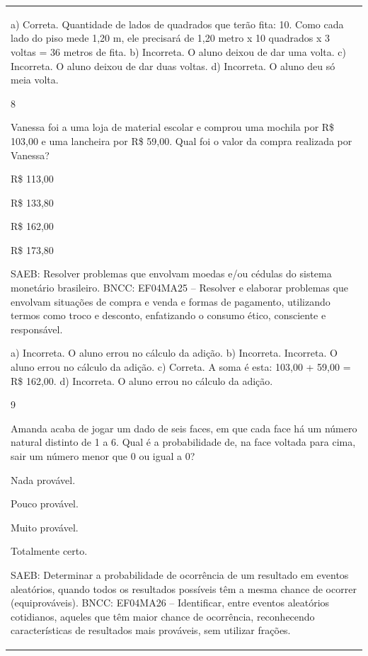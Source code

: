\begin{mdframed}[linewidth=2pt,linecolor=salmao,roundcorner=2pt]
\begin{escolha}
{{{\begin{longtable}[]{@{}l@{}}
\begin{itemize}
{a) Correta. Quantidade de lados de quadrados que terão fita: 10. Como cada lado do piso mede 1,20 m, ele precisará de 1,20 metro x 10 quadrados x 3 voltas = 36 metros de fita.
b) Incorreta. O aluno deixou de dar uma volta.
c) Incorreta. O aluno deixou de dar duas voltas.
d) Incorreta. O aluno deu só meia volta.

\num{8}

Vanessa foi a uma loja de material escolar e comprou uma mochila por R\$ 103,00 e uma lancheira por R\$ 59,00. Qual foi o valor da compra realizada por Vanessa?

\begin{escolha}
\item
  R\$ 113,00
\item
  R\$ 133,80
\item
  R\$ 162,00
\item
  R\$ 173,80
\end{escolha}

SAEB: Resolver problemas que envolvam moedas e/ou cédulas do
sistema monetário brasileiro.
BNCC: EF04MA25 -- Resolver e elaborar problemas que envolvam situações de compra e venda e formas
de pagamento, utilizando termos como troco e desconto, enfatizando o consumo ético, consciente e
responsável.

a) Incorreta. O aluno errou no cálculo da adição.
b) Incorreta. Incorreta. O aluno errou no cálculo da adição.
c) Correta. A soma é esta: 103,00 + 59,00 = R\$ 162,00.
d) Incorreta. O aluno errou no cálculo da adição.

\num{9}

Amanda acaba de jogar um dado de seis faces, em que cada face
há um número natural distinto de 1 a 6. Qual é a probabilidade de, na
face voltada para cima, sair um número menor que 0 ou igual a 0?

\begin{escolha}
\item
  Nada provável.
\item
  Pouco provável.
\item
  Muito provável.
\item
  Totalmente certo.
\end{escolha}

SAEB: Determinar a probabilidade de ocorrência de um
resultado em eventos aleatórios, quando todos os resultados possíveis
têm a mesma chance de ocorrer (equiprováveis).
BNCC: EF04MA26 -- Identificar, entre eventos aleatórios cotidianos, aqueles que têm maior chance de
ocorrência, reconhecendo características de resultados mais prováveis, sem utilizar frações.

}
\end{itemize}
\end{longtable}}}}
\end{escolha}
\end{mdframed}
